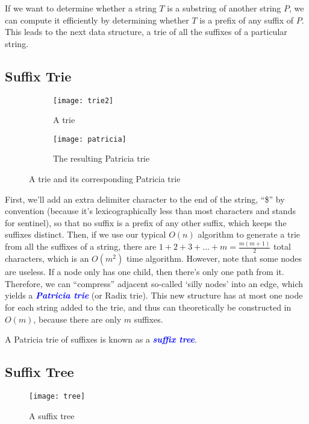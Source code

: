 \documentclass[11pt, oneside]{article}
\newcommand{\emphasis}[1]{\textcolor{blue}{\textbf{\textit{#1}}}}
\begin{document}
If we want to determine whether a string \( T \) is a substring of another string \( P \),
we can compute it efficiently by determining whether \( T \) is a prefix of any suffix of \( P \).
This leads to the next data structure, a trie of all the suffixes of a particular string.

\subsection{Suffix Trie}

\begin{figure}[h!]
    \centering
    \begin{subfigure}[h]{0.4 \textwidth}
      \texttt{[image: trie2]}
      \caption{A trie}
    \end{subfigure}
    \hfill
    \begin{subfigure}[h]{0.4 \textwidth}
      \texttt{[image: patricia]}
      \caption{The resulting Patricia trie}
    \end{subfigure}
    \caption{A trie and its corresponding Patricia trie}
\end{figure}

First, we'll add an extra delimiter character to the end of the string,
``\$'' by convention (because it's lexicographically less than most characters and stands for sentinel),
so that no suffix is a prefix of any other suffix, which keeps the suffixes distinct.
Then, if we use our typical \( O(n) \) algorithm to generate a trie from all the suffixes of a string,
there are \( 1 + 2 + 3 + \dots + m = \frac{m(m + 1)}{2} \) total characters,
which is an \( O(m^2) \) time algorithm. However, note that some nodes are useless.
If a node only has one child, then there's only one path from it.
Therefore, we can ``compress'' adjacent so-called `silly nodes' into an edge,
which yields a \emphasis{Patricia trie} (or Radix trie).
This new structure has at most one node for each string added to the trie,
and thus can theoretically be constructed in \( O(m) \), because there are only \( m \) suffixes.

A Patricia trie of suffixes is known as a \emphasis{suffix tree}.

\subsection{Suffix Tree}

\begin{figure}[h!]
\centering
\texttt{[image: tree]}
\caption{A suffix tree}
\end{figure}
\end{document}

